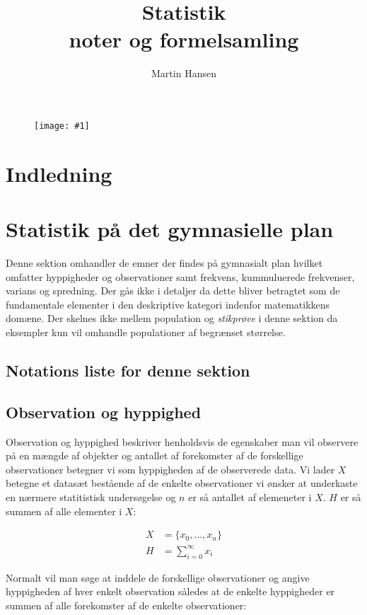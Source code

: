 \documentclass{article}
\title{Statistik \\ \large noter og formelsamling}
\author{Martin Hansen}
\newcommand{\frontpic}[1]{\begin{figure}[h!]
		\centering
		\texttt{[image: \#1]}
		\label{fig:math}
\end{figure}}
\newcommand{\mAlign}[1]{\begin{align*}#1\end{align*}}
\newcommand{\summation}[2]{\sum\limits_{#1}^{#2}}
\begin{document}
	
	\maketitle
	\frontpic{probandstat.png}
	
	\pagebreak
	\tableofcontents
	
	\pagebreak
	
	\section{Indledning}
	
	
	\section{Statistik på det gymnasielle plan}
	
	Denne sektion omhandler de emner der findes på gymnasialt plan hvilket omfatter hyppigheder og observationer samt frekvens, kummuluerede frekvenser, varians og spredning. Der gås ikke i detaljer da dette bliver betragtet som de fundamentale elementer i den deskriptive kategori indenfor matematikkens domæne. Der skelnes ikke mellem population og \textit{stikprøve} i denne sektion da eksempler kun vil omhandle populationer af begrænset størrelse.
	
	\subsection{Notations liste for denne sektion}
	
	
	\subsection{Observation og hyppighed}
	
	Observation og hyppighed beskriver henholdsvis de egenskaber man vil observere på en mængde af objekter  og antallet af forekomster af de forskellige observationer betegner vi som hyppigheden af de observerede data. Vi lader $X$ betegne et datasæt bestående af de enkelte observationer vi ønsker at underkaste en nærmere statitistisk undersøgelse og $ n $ er så antallet af elemeneter i $ X $. $H$ er så summen af alle elementer i $X$:
	
	\mAlign{X &=  \{x_0, \dots , x_n\} \\
		H &= \summation{i = 0}{\infty} x_i}
	
	Normalt vil man søge at inddele de forskellige observationer og angive hyppigheden af hver enkelt observation således at de enkelte hyppigheder er summen af alle forekomster af de enkelte observationer:
	
\end{document}
